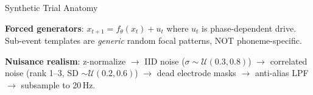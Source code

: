 \documentclass[aspectratio=169, 11pt]{beamer}
\begin{document}
\begin{frame}{Synthetic Trial Anatomy}
\begin{center}
\end{center}

\vspace{0.3em}
\small
\textbf{Forced generators}: $x_{t+1} = f_\theta(x_t) + u_t$ where $u_t$ is phase-dependent drive.
Sub-event templates are \emph{generic} random focal patterns, NOT phoneme-specific.

\vspace{0.2em}
\textbf{Nuisance realism}: z-normalize $\to$ IID noise ($\sigma \sim \mathcal{U}(0.3, 0.8)$) $\to$ correlated noise (rank 1--3, SD $\sim \mathcal{U}(0.2, 0.6)$) $\to$ dead electrode masks $\to$ anti-alias LPF $\to$ subsample to 20\,Hz.
\end{frame}

\end{document}
